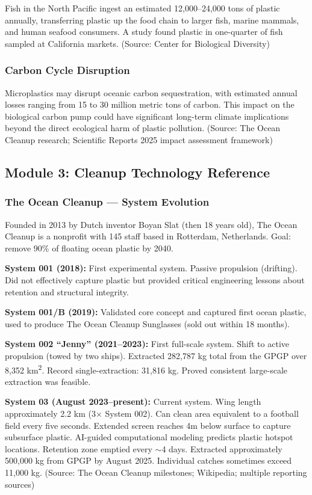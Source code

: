 \documentclass[11pt,letterpaper]{article}
\begin{document}
Fish in the North Pacific ingest an estimated 12,000--24,000 tons of plastic annually, transferring plastic up the food chain to larger fish, marine mammals, and human seafood consumers. A study found plastic in one-quarter of fish sampled at California markets. (Source: Center for Biological Diversity)

\subsubsection{Carbon Cycle Disruption}
Microplastics may disrupt oceanic carbon sequestration, with estimated annual losses ranging from 15 to 30 million metric tons of carbon. This impact on the biological carbon pump could have significant long-term climate implications beyond the direct ecological harm of plastic pollution. (Source: The Ocean Cleanup research; Scientific Reports 2025 impact assessment framework)

\subsection{Module 3: Cleanup Technology Reference}

\subsubsection{The Ocean Cleanup --- System Evolution}
Founded in 2013 by Dutch inventor Boyan Slat (then 18 years old), The Ocean Cleanup is a nonprofit with 145 staff based in Rotterdam, Netherlands. Goal: remove 90\% of floating ocean plastic by 2040.

\textbf{System 001 (2018):} First experimental system. Passive propulsion (drifting). Did not effectively capture plastic but provided critical engineering lessons about retention and structural integrity.

\textbf{System 001/B (2019):} Validated core concept and captured first ocean plastic, used to produce The Ocean Cleanup Sunglasses (sold out within 18 months).

\textbf{System 002 ``Jenny'' (2021--2023):} First full-scale system. Shift to active propulsion (towed by two ships). Extracted 282,787 kg total from the GPGP over 8,352 km\textsuperscript{2}. Record single-extraction: 31,816 kg. Proved consistent large-scale extraction was feasible.

\textbf{System 03 (August 2023--present):} Current system. Wing length approximately 2.2 km (3$\times$ System 002). Can clean area equivalent to a football field every five seconds. Extended screen reaches 4m below surface to capture subsurface plastic. AI-guided computational modeling predicts plastic hotspot locations. Retention zone emptied every $\sim$4 days. Extracted approximately 500,000 kg from GPGP by August 2025. Individual catches sometimes exceed 11,000 kg. (Source: The Ocean Cleanup milestones; Wikipedia; multiple reporting sources)
\end{document}
